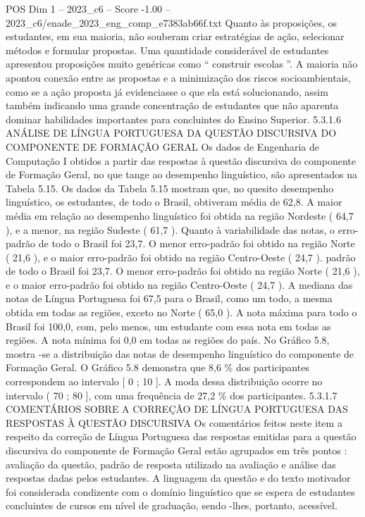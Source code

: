 \begin{textsample}{POS Dim 1 – 2023\_c6 – Score -1.00 – 2023\_c6/enade\_2023\_eng\_comp\_e7383ab66f.txt}
Quanto às proposições, os estudantes, em sua maioria, não souberam criar estratégias de ação, selecionar métodos e formular propostas.
Uma quantidade considerável de estudantes apresentou proposições muito genéricas como “ construir escolas ”.
A maioria não apontou conexão entre as propostas e a minimização dos riscos socioambientais, como se a ação proposta já evidenciasse o que ela está solucionando, assim também indicando uma grande concentração de estudantes que não aparenta dominar habilidades importantes para concluintes do Ensino Superior. 5.3.1.6 ANÁLISE DE LÍNGUA PORTUGUESA DA QUESTÃO DISCURSIVA DO COMPONENTE DE FORMAÇÃO GERAL Os dados de Engenharia de Computação I obtidos a partir das respostas à questão discursiva do componente de Formação Geral, no que tange ao desempenho linguístico, são apresentados na Tabela 5.15.
Os dados da Tabela 5.15 mostram que, no quesito desempenho linguístico, os estudantes, de todo o Brasil, obtiveram média de 62,8.
A maior média em relação ao desempenho linguístico foi obtida na região Nordeste ( 64,7 ), e a menor, na região Sudeste ( 61,7 ).
Quanto à variabilidade das notas, o erro-padrão de todo o Brasil foi 23,7.
O menor erro-padrão foi obtido na região Norte ( 21,6 ), e o maior erro-padrão foi obtido na região Centro-Oeste ( 24,7 ). padrão de todo o Brasil foi 23,7.
O menor erro-padrão foi obtido na região Norte ( 21,6 ), e o maior erro-padrão foi obtido na região Centro-Oeste ( 24,7 ).
A mediana das notas de Língua Portuguesa foi 67,5 para o Brasil, como um todo, a mesma obtida em todas as regiões, exceto no Norte ( 65,0 ).
A nota máxima para todo o Brasil foi 100,0, com, pelo menos, um estudante com essa nota em todas as regiões.
A nota mínima foi 0,0 em todas as regiões do país.
No Gráfico 5.8, mostra -se a distribuição das notas de desempenho linguístico do componente de Formação Geral.
O Gráfico 5.8 demonstra que 8,6 \% dos participantes correspondem ao intervalo [ 0 ; 10 ].
A moda dessa distribuição ocorre no intervalo ( 70 ; 80 ], com uma frequência de 27,2 \% dos participantes. 5.3.1.7 COMENTÁRIOS SOBRE A CORREÇÃO DE LÍNGUA PORTUGUESA DAS RESPOSTAS À QUESTÃO DISCURSIVA Os comentários feitos neste item a respeito da correção de Língua Portuguesa das respostas emitidas para a questão discursiva do componente de Formação Geral estão agrupados em três pontos : avaliação da questão, padrão de resposta utilizado na avaliação e análise das respostas dadas pelos estudantes.
A linguagem da questão e do texto motivador foi considerada condizente com o domínio linguístico que se espera de estudantes concluintes de cursos em nível de graduação, sendo -lhes, portanto, acessível.

\end{textsample}
